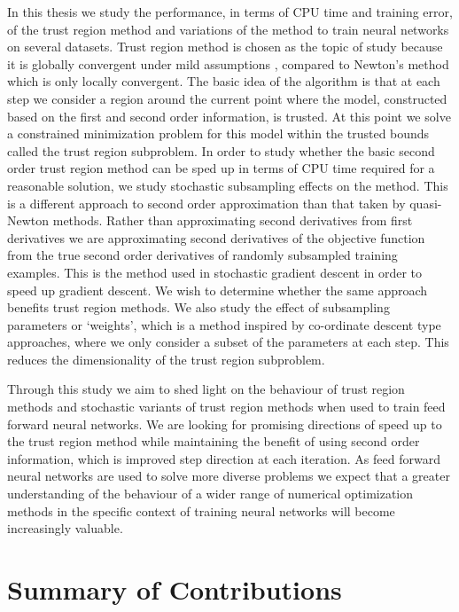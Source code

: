 \documentclass[letterpaper,12pt,titlepage,oneside,final]{book}
\begin{document}
	In this thesis we study the performance, in terms of CPU time and training error, of the trust region method and variations of the method to train neural networks on several datasets. Trust region method is chosen as the topic of study because it is globally convergent under mild assumptions \cite{shultz1985family}, compared to Newton's method which is only locally convergent. The basic idea of the algorithm is that at each step we consider a region around the current point where the model, constructed based on the first and second order information, is trusted. At this point we solve a constrained minimization problem for this model within the trusted bounds called the trust region subproblem. In order to study whether the basic second order trust region method can be sped up in terms of CPU time required for a reasonable solution, we study stochastic subsampling effects on the method. This is a different approach to second order approximation than that taken by quasi-Newton methods. Rather than approximating second derivatives from first derivatives we are approximating second derivatives of the objective function from the true second order derivatives of randomly subsampled training examples. This is the method used in stochastic gradient descent in order to speed up gradient descent. We wish to determine whether the same approach benefits trust region methods. We also study the effect of subsampling parameters or `weights', which is a method inspired by co-ordinate descent type approaches, where we only consider a subset of the parameters at each step. This reduces the dimensionality of the trust region subproblem.
	
	Through this study we aim to shed light on the behaviour of trust region methods and stochastic variants of trust region methods when used to train feed forward neural networks. We are looking for promising directions of speed up to the trust region method while maintaining the benefit of using second order information, which is improved step direction at each iteration. As feed forward neural networks are used to solve more diverse problems we expect that a greater understanding of the behaviour of a wider range of numerical optimization methods in the specific context of training neural networks will become increasingly valuable.
	
	\section{Summary of Contributions}
	
\end{document}

